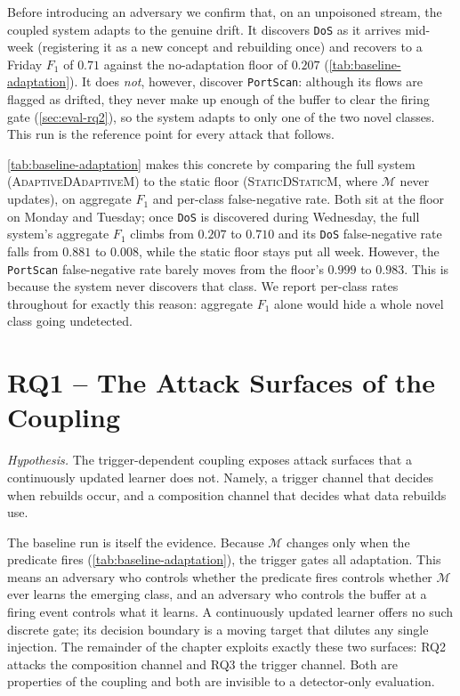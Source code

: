 Before introducing an adversary we confirm that, on an unpoisoned stream, the coupled system adapts to the genuine drift. It discovers \texttt{DoS} as it arrives mid-week (registering it as a new concept and rebuilding once) and recovers to a Friday $F_1$ of $0.71$ against the no-adaptation floor of $0.207$ (\cref{tab:baseline-adaptation}). It does \emph{not}, however, discover \texttt{PortScan}: although its flows are flagged as drifted, they never make up enough of the buffer to clear the firing gate (\cref{sec:eval-rq2}), so the system adapts to only one of the two novel classes. This run is the reference point for every attack that follows.

\cref{tab:baseline-adaptation} makes this concrete by comparing the full system (\textsc{AdaptiveDAdaptiveM}) to the static floor (\textsc{StaticDStaticM}, where $\mathcal{M}$ never updates), on aggregate $F_1$ and per-class false-negative rate. Both sit at the floor on Monday and Tuesday; once \texttt{DoS} is discovered during Wednesday, the full system's aggregate $F_1$ climbs from $0.207$ to $0.710$ and its \texttt{DoS} false-negative rate falls from $0.881$ to $0.008$, while the static floor stays put all week. However, the \texttt{PortScan} false-negative rate barely moves from the floor's $0.999$ to $0.983$. This is because the system never discovers that class. We report per-class rates throughout for exactly this reason: aggregate $F_1$ alone would hide a whole novel class going undetected.



\clearpage

\section{RQ1 -- The Attack Surfaces of the Coupling}
\label{sec:eval-rq1}
\textit{Hypothesis.} The trigger-dependent coupling exposes attack surfaces that a continuously updated learner does not. Namely, a trigger channel that decides when rebuilds occur, and a composition channel that decides what data rebuilds use.

The baseline run is itself the evidence. Because $\mathcal{M}$ changes only when the predicate fires (\cref{tab:baseline-adaptation}), the trigger gates all adaptation. This means an adversary who controls whether the predicate fires controls whether $\mathcal{M}$ ever learns the emerging class, and an adversary who controls the buffer at a firing event controls what it learns. A continuously updated learner offers no such discrete gate; its decision boundary is a moving target that dilutes any single injection. The remainder of the chapter exploits exactly these two surfaces: RQ2 attacks the composition channel and RQ3 the trigger channel. Both are properties of the coupling and both are invisible to a detector-only evaluation.
\clearpage

